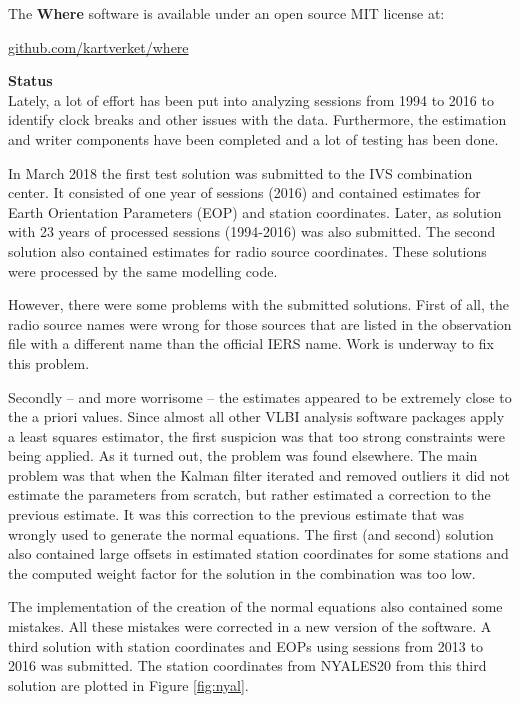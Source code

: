 The \textbf{Where} software is available under an open source MIT license at:\\[-10pt]
\begin{center}
\url{github.com/kartverket/where}
\end{center}

{\large\bfseries Status}\\

Lately, a lot of effort has been put into analyzing sessions from 1994 to 2016 to identify clock breaks and other
issues with the data. Furthermore, the estimation and writer components have been completed and a lot of testing has
been done.

In March 2018 the first test solution was submitted to the IVS combination center. It consisted of one year of sessions
(2016) and contained estimates for Earth Orientation Parameters (EOP) and station coordinates. Later, as solution with
23 years of processed sessions (1994-2016) was also submitted. The second solution also contained estimates for radio
source coordinates. These solutions were processed by the same modelling code.

However, there were some problems with the submitted solutions. First of all, the radio source names were wrong for
those sources that are listed in the observation file with a different name than the official IERS name. Work is
underway to fix this problem.

Secondly -- and more worrisome -- the estimates appeared to be extremely close to the a priori values. Since almost all
other VLBI analysis software packages apply a least squares estimator, the first suspicion was that too strong
constraints were being applied.  As it turned out, the problem was found elsewhere. The main problem was that when the
Kalman filter iterated and removed outliers it did not estimate the parameters from scratch, but rather estimated a
correction to the previous estimate. It was this correction to the previous estimate that was wrongly used to generate
the normal equations.  The first (and second) solution also contained large offsets in estimated station coordinates for
some stations and the computed weight factor for the solution in the combination was too low.

The implementation of the creation of the normal equations also contained some mistakes. All these mistakes were
corrected in a new version of the software. A third solution with station coordinates and EOPs using sessions from 2013
to 2016 was submitted. The station coordinates from NYALES20 from this third solution are plotted in
Figure \ref{fig:nyal}.

